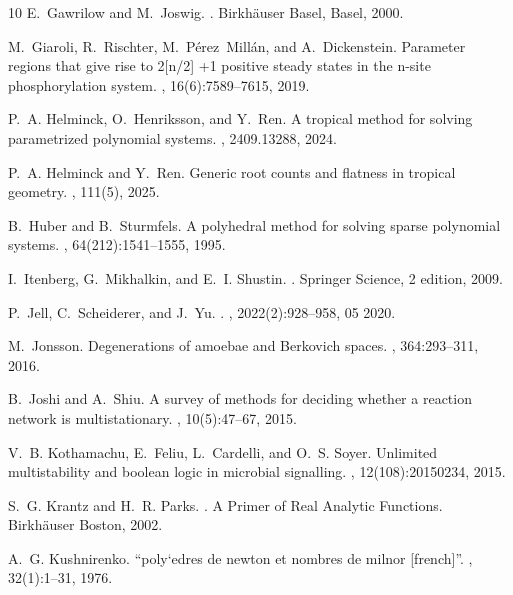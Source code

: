 \documentclass{article}
\theoremstyle{definition}
\begin{document}
{\begin{thebibliography}{10}
E.~Gawrilow and M.~Joswig.
.
\newblock Birkh{\"a}user Basel, Basel, 2000.

M.~Giaroli, R.~Rischter, M.~Pérez~Millán, and A.~Dickenstein.
\newblock Parameter regions that give rise to 2[n/2] +1 positive steady states in the n-site phosphorylation system.
, 16(6):7589--7615, 2019.

P.~A. Helminck, O.~Henriksson, and Y.~Ren.
\newblock A tropical method for solving parametrized polynomial systems.
, 2409.13288, 2024.

P.~A. Helminck and Y.~Ren.
\newblock Generic root counts and flatness in tropical geometry.
, 111(5), 2025.

B.~Huber and B.~Sturmfels.
\newblock A polyhedral method for solving sparse polynomial systems.
, 64(212):1541--1555, 1995.

I.~Itenberg, G.~Mikhalkin, and E.~I. Shustin.
.
\newblock Springer Science, 2 edition, 2009.

P.~Jell, C.~Scheiderer, and J.~Yu.
.
, 2022(2):928--958, 05 2020.

M.~Jonsson.
\newblock Degenerations of amoebae and {B}erkovich spaces.
, 364:293–311, 2016.

B.~Joshi and A.~Shiu.
\newblock A survey of methods for deciding whether a reaction network is multistationary.
, 10(5):47--67, 2015.

V.~B. Kothamachu, E.~Feliu, L.~Cardelli, and O.~S. Soyer.
\newblock Unlimited multistability and boolean logic in microbial signalling.
, 12(108):20150234, 2015.

S.~G. Krantz and H.~R. Parks.
.
\newblock A Primer of Real Analytic Functions. Birkh{\"a}user Boston, 2002.

A.~G. Kushnirenko.
\newblock “poly`edres de newton et nombres de milnor [french]”.
, 32(1):1–31, 1976.


\end{thebibliography}}
\end{document}

